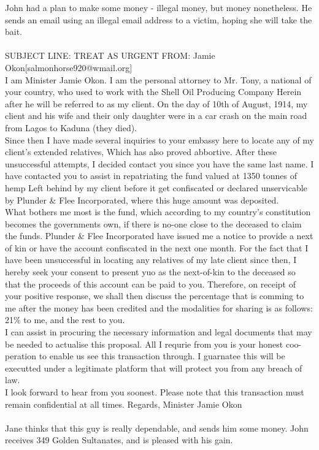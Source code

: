 \documentclass{article}
\begin{document}
John had a plan to make some money {-} illegal money, but money nonetheless.
He sends an email using an illegal email address to a victim, hoping she will take the bait.
\\\\
SUBJECT LINE: TREAT AS URGENT
FROM: Jamie Okon[salmonhorse920@wmail.org]
\\
I am Minister Jamie Okon.
I am the personal attorney to Mr. Tony, a national of your country, who used to work with the Shell Oil Producing Company
Herein after he will be referred to as my client.
On the day of 10th of August, 1914, my client and his wife and their only daughter were in a car crash on the main road from Lagos to Kaduna (they died).
\\
Since then I have made several inquiries to your embassy here to locate any of my client's extended relatives, Which has also proved abbortive.
After these unsuccessful attempts, I decided contact you since you have the same last name.
I have contacted you to assist in repatriating the fund valued at 1350 tonnes of hemp Left behind by my client before it get confiscated or declared unservicable by Plunder \& Flee Incorporated, where this huge amount was deposited.
\\
What bothers me most is the fund, which according to my country's constitution becomes the governments own, if there is no{-}one close to the deceased to claim the funds.
Plunder \& Flee Incorporated have issued me a notice to provide a next of kin or have the account confiscated in the next one month.
For the fact that I have been unsuccessful in locating any relatives of my late client since then, I hereby seek your consent to present yuo as the next{-}of{-}kin to the deceased so that the proceeds of this account can be paid to you.
Therefore, on receipt of your positive response, we shall then discuss the percentage that is comming to me after the money has been credited and the modalities for sharing is as follows: 21\% to me, and the rest to you.
\\
I can assist in procuring the necessary information and legal documents that may be needed to actualise this proposal.
All I requrie from you is your honest coo{-}peration to enable us see this transaction through.
I guarnatee this will be executted under a legitimate platform that will protect you from any breach of law.
\\
I look forward to hear from you soonest.
Please note that this transaction must remain confidential at all times.
Regards, Minister Jamie Okon
\\\\
Jane thinks that this guy is really dependable, and sends him some money.
John receives 349 Golden Sultanates, and is pleased with his gain.
\end{document}
